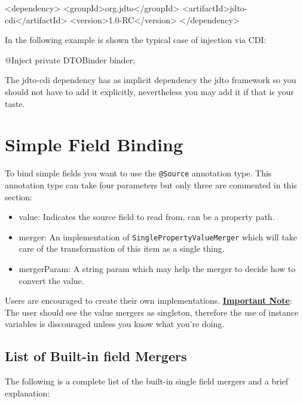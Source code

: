 \documentclass[11pt]{article}
\begin{document}
\begin{xml}
    <dependency>
        <groupId>org.jdto</groupId>
        <artifactId>jdto-cdi</artifactId>
        <version>1.0-RC</version>
    </dependency>
\end{xml}

In the following example is shown the typical case of injection via CDI:


\begin{java}
@Inject
private DTOBinder binder;
\end{java}

The jdto-cdi dependency has as implicit dependency the jdto framework so you should not have to add it explicitly, nevertheless you may add it if that is your taste.
 

\section{Simple Field Binding}


To bind simple fields you want to use the \texttt{@Source} annotation type.
This annotation type can take four parameters but only three are commented in this section:

\begin{itemize}
 \item value: Indicates the source field to read from, can be a property path.
 \item merger: An implementation of \texttt{SinglePropertyValueMerger} which will take care of the transformation of this item as a single thing.
 \item mergerParam: A string param which may help the merger to decide how to convert the value.
\end{itemize}

Users are encouraged to create their own implementations. \textbf{\underline{Important Note}}: The user should see
the value mergers as singleton, therefore the use of instance variables is discouraged unless you know what you're doing.


\subsection{List of Built-in field Mergers}


The following is a complete list of the built-in single field mergers and a brief explanation:
\end{document}
